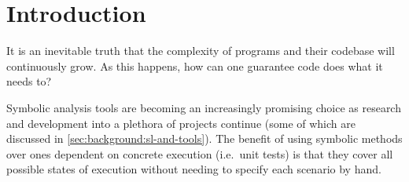 
\chapter{Introduction}\label{sec:intro}




It is an inevitable truth that the complexity of programs and their codebase
will continuously grow. As this happens, how can one guarantee code does what
it needs to?


Symbolic analysis tools are becoming an increasingly promising choice as
research and development into a plethora of projects continue (some of which
are discussed in \autoref{sec:background:sl-and-tools}). The benefit of using
symbolic methods over ones dependent on concrete execution (i.e.\ unit tests) is
that they cover all possible states of execution without needing to specify each
scenario by hand.


